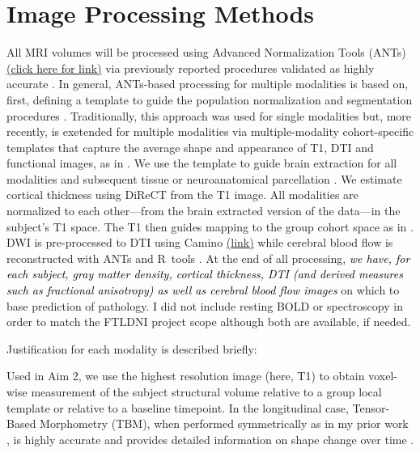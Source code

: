 \section{Image Processing Methods}

All MRI volumes will be processed using Advanced Normalization Tools
(ANTs) \href{http://www.picsl.upenn.edu/ANTS}{(click here for
link)}\cite{Avants2011a,Avants2011,Murphy2011,Tustison2010,Tustison2011,Tustison2011a}
via previously reported procedures validated as highly accurate
\cite{Klein2009,Klein2010,Murphy2011,Avants2011}.  In general, ANTs-based
processing for multiple modalities is based on, first, defining a
template to guide the population normalization and segmentation
procedures \cite{avants2011a,avants2011}.  Traditionally, this
approach was used for single modalities but, more recently, is
exetended for multiple modalities via multiple-modality cohort-specific templates
that capture the average shape and appearance of T1, DTI and
functional images, as in \cite{Kim2010,avants2011a,Jain2012,Tustison2012}.  We use the
template to guide brain extraction for all modalities and subsequent
tissue or neuroanatomical parcellation \cite{}.  We estimate
cortical thickness using DiReCT \cite{Das2009a} from the T1 image.
All modalities are normalized to each other---from the brain extracted
version of the data---in the subject's T1 space.  The T1 then guides
mapping to the group cohort space as in \cite{Tustison2012}.  DWI is
pre-processed to DTI using Camino \cite{Cook2006ISMRM}
\href{http://cmic.cs.ucl.ac.uk/camino/}{(link)} while cerebral blood
flow is reconstructed with ANTs and R~tools \cite{Jain2012}. At the
end of all processing, \textcolor{black}{{\em we have, for each
subject, gray matter density, cortical thickness, DTI (and derived
measures such as fractional anisotropy) as well as cerebral blood flow
images}} on which to base prediction of pathology.  I did not include
resting BOLD or spectroscopy in order to match the FTLDNI project
scope although both are available, if needed.


Justification for each modality is described briefly: 

  Used in Aim 2, we use the highest resolution image (here, T1) to obtain voxel-wise measurement of the subject structural volume relative to a group local template or relative to a baseline timepoint.  In the longitudinal case, Tensor-Based Morphometry (TBM), when performed symmetrically as in my prior work \cite{Yushkevich2010a,Das2012}, is highly accurate and provides detailed information on shape change over time \cite{Brambati2007998,Hua2011}.  

